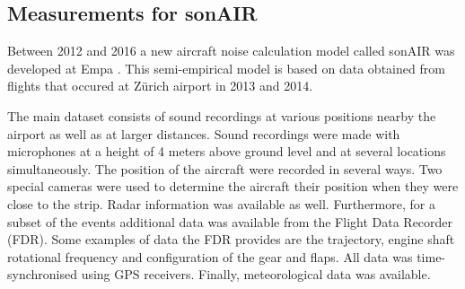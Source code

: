 %
%
%
%
%
%
%
%


\subsection{Measurements for sonAIR}\label{sec:introduction:sonair}
Between 2012 and 2016 a new aircraft noise calculation model called sonAIR was
developed at Empa \cite{Zellmann2013,Zellmann2016}. This semi-empirical model is
based on data obtained from flights that occured at Z\"{u}rich airport in 2013 and
2014.

The main dataset consists of sound recordings at various positions nearby the
airport as well as at larger distances. Sound recordings were made with
microphones at a height of 4 meters above ground level and at several locations
simultaneously. The position of the aircraft were recorded in several ways. Two
special cameras were used to determine the aircraft their position when they
were close to the strip. Radar information was available as well. Furthermore,
for a subset of the events additional data was available from the Flight Data
Recorder (FDR). Some examples of data the FDR provides are the trajectory,
engine shaft rotational frequency and configuration of the gear and flaps. All
data was time-synchronised using GPS receivers. Finally, meteorological data was
available.



